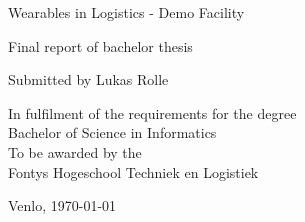 \begin{titlepage}
    \begin{center}
        \vspace*{1cm}
        
        \Huge
        Wearables in Logistics - Demo Facility
                
        \vspace{1cm}
        \LARGE
        Final report of bachelor thesis
        
        \vspace{5cm}
        Submitted by Lukas Rolle
        
        \vspace{1cm}
        \large
        In fulfilment of the requirements for the degree\\
        Bachelor of Science in Informatics\\
        To be awarded by the\\
        Fontys Hogeschool Techniek en Logistiek
        
        \vfill
        
        \normalsize
        Venlo, \today
        
    \end{center}
\end{titlepage}
